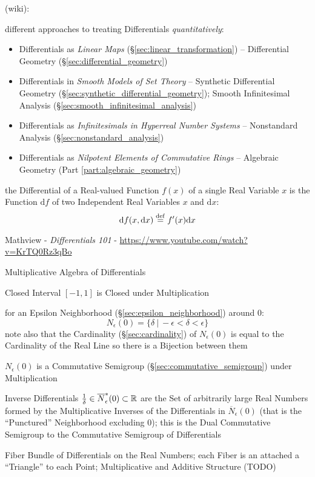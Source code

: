 (wiki):

different approaches to treating Differentials \emph{quantitatively}:
\begin{itemize}
  \item Differentials as \emph{Linear Maps} (\S\ref{sec:linear_transformation})
    -- Differential Geometry (\S\ref{sec:differential_geometry})
  \item Differentials in \emph{Smooth Models of Set Theory} -- Synthetic
    Differential Geometry (\S\ref{sec:synthetic_differential_geometry}); Smooth
    Infinitesimal Analysis (\S\ref{sec:smooth_infinitesimal_analysis})
  \item Differentials as \emph{Infinitesimals in Hyperreal Number Systems} --
    Nonstandard Analysis (\S\ref{sec:nonstandard_analysis})
  \item Differentials as \emph{Nilpotent Elements of Commutative Rings} --
    Algebraic Geometry (Part \ref{part:algebraic_geometry})
\end{itemize}

the Differential of a Real-valued Function $f(x)$ of a single Real Variable $x$
is the Function $\mathrm{d}f$ of two Independent Real Variables $x$ and
$\mathrm{d}x$:
\[
  \mathrm{d}f(x, \mathrm{d}x) \stackrel{\mathrm{def}}= f'(x)\mathrm{d}x
\]

\asterism

Mathview - \emph{Differentials 101} -
\url{https://www.youtube.com/watch?v=KrTQ0Rz3qBo}

Multiplicative Algebra of Differentials

Closed Interval $[-1, 1]$ is Closed under Multiplication

for an Epsilon Neighborhood (\S\ref{sec:epsilon_neighborhood}) around $0$:
\[
  N_\epsilon(0) = \{ \delta \ |\ -\epsilon < \delta < \epsilon \}
\]
note also that the Cardinality (\S\ref{sec:cardinality}) of $N_\epsilon(0)$ is
equal to the Cardinality of the Real Line so there is a Bijection between them

$N_\epsilon(0)$ is a Commutative Semigroup (\S\ref{sec:commutative_semigroup})
under Multiplication

Inverse Differentials $\frac{1}{\delta} \in \overline{N}_\epsilon^*(0)
\subset \mathbb{R}$ are the Set of arbitrarily large Real Numbers formed by the
Multiplicative Inverses of the Differentials in $\overline{N}_\epsilon(0)$ (that
is the ``Punctured'' Neighborhood excluding $0$); this is the Dual Commutative
Semigroup to the Commutative Semigroup of Differentials

Fiber Bundle of Differentials on the Real Numbers; each Fiber is an attached a
``Triangle'' to each Point; Multiplicative and Additive Structure (TODO)

